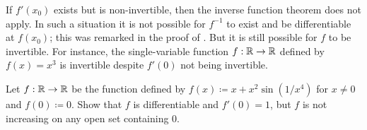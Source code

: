 \begin{note}
  If \(f'(x_0)\) exists but is non-invertible, then the inverse function theorem does not apply.
  In such a situation it is not possible for \(f^{-1}\) to exist and be differentiable at \(f(x_0)\);
  this was remarked in the proof of .
  But it is still possible for \(f\) to be invertible.
  For instance, the single-variable function \(f : \mathbb{R} \to \mathbb{R}\) defined by \(f(x) = x^3\) is invertible despite \(f'(0)\) not being invertible.
\end{note}

\exercisesection

\begin{ex}\label{ii:ex:6.7.1}
  Let \(f : \mathbb{R} \to \mathbb{R}\) be the function defined by \(f(x) \coloneqq x + x^2 \sin(1 / x^4)\) for \(x \neq 0\) and \(f(0) \coloneqq 0\).
  Show that \(f\) is differentiable and \(f'(0) = 1\), but \(f\) is not increasing on any open set containing \(0\).
\end{ex}

